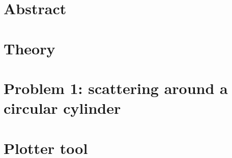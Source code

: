 \documentclass{report}
\begin{document}
    
    

\chapter*{Abstract}
    


\chapter{Theory}
    


\chapter{Problem 1: scattering around a circular cylinder}
    

\chapter{Plotter tool}
    



\end{document}
